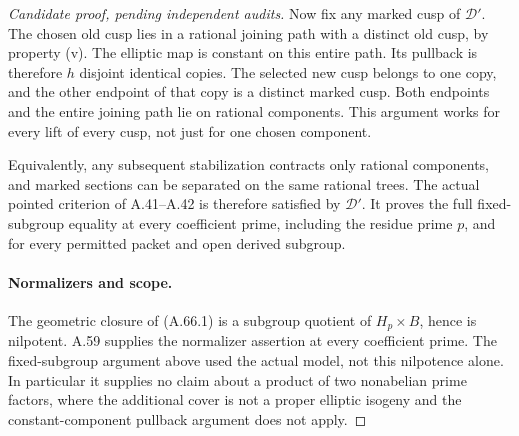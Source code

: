 \begin{proof}[Candidate proof, pending independent audits]
Now fix any marked cusp of \(\mathcal D'\). The chosen
old cusp lies in a rational joining path with a distinct
old cusp, by property (v). The elliptic map is constant
on this entire path. Its pullback is therefore \(h\)
disjoint identical copies. The selected new cusp belongs
to one copy, and the other endpoint of that copy is a
distinct marked cusp. Both endpoints and the entire
joining path lie on rational components. This argument
works for every lift of every cusp, not just for one
chosen component.

Equivalently, any subsequent stabilization contracts only
rational components, and marked sections can be separated
on the same rational trees. The actual pointed criterion
of A.41--A.42 is therefore satisfied by \(\mathcal D'\).
It proves the full fixed-subgroup equality at every
coefficient prime, including the residue prime \(p\),
and for every permitted packet and open derived subgroup.

\paragraph{Normalizers and scope.}
The geometric closure of (A.66.1) is a subgroup quotient
of \(H_p\times B\), hence is nilpotent. A.59 supplies the
normalizer assertion at every coefficient prime. The
fixed-subgroup argument above used the actual model,
not this nilpotence alone. In particular it supplies no
claim about a product of two nonabelian prime factors,
where the additional cover is not a proper elliptic
isogeny and the constant-component pullback argument
does not apply.
\end{proof}
